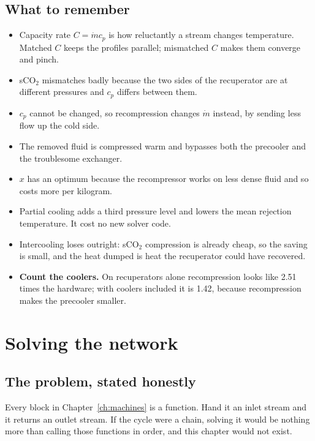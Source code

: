 \documentclass[11pt,a4paper]{report}
\begin{document}
\section{What to remember}

\begin{itemize}\itemsep2pt
\item Capacity rate $C = \dot m c_p$ is how reluctantly a stream changes
      temperature. Matched $C$ keeps the profiles parallel; mismatched $C$
      makes them converge and pinch.
\item sCO$_2$ mismatches badly because the two sides of the recuperator are
      at different pressures and $c_p$ differs between them.
\item $c_p$ cannot be changed, so recompression changes $\dot m$ instead, by
      sending less flow up the cold side.
\item The removed fluid is compressed warm and bypasses both the precooler
      and the troublesome exchanger.
\item $x$ has an optimum because the recompressor works on less dense fluid
      and so costs more per kilogram.
\item Partial cooling adds a third pressure level and lowers the mean
      rejection temperature. It cost no new solver code.
\item Intercooling loses outright: sCO$_2$ compression is already cheap, so
      the saving is small, and the heat dumped is heat the recuperator could
      have recovered.
\item \textbf{Count the coolers.} On recuperators alone recompression looks
      like \num{2.51} times the hardware; with coolers included it is
      \num{1.42}, because recompression makes the precooler smaller.
\end{itemize}

\chapter{Solving the network}
\label{ch:solving}

\section{The problem, stated honestly}

Every block in Chapter~\ref{ch:machines} is a function. Hand it an inlet
stream and it returns an outlet stream. If the cycle were a chain, solving
it would be nothing more than calling those functions in order, and this
chapter would not exist.
\end{document}
